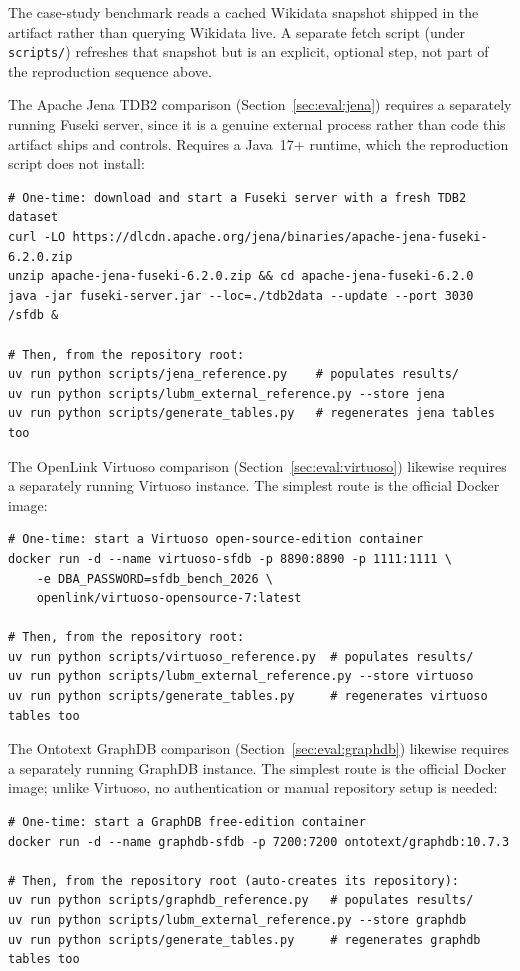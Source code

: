 The case-study benchmark reads a cached Wikidata snapshot shipped in the
artifact rather than querying Wikidata live. A separate fetch script
(under \texttt{scripts/}) refreshes that snapshot but is an explicit,
optional step, not part of the reproduction sequence above.

The Apache Jena TDB2 comparison (Section~\ref{sec:eval:jena}) requires a
separately running Fuseki server, since it is a genuine external process
rather than code this artifact ships and controls. Requires a Java~17+
runtime, which the reproduction script does not install:

\begin{verbatim}
# One-time: download and start a Fuseki server with a fresh TDB2 dataset
curl -LO https://dlcdn.apache.org/jena/binaries/apache-jena-fuseki-6.2.0.zip
unzip apache-jena-fuseki-6.2.0.zip && cd apache-jena-fuseki-6.2.0
java -jar fuseki-server.jar --loc=./tdb2data --update --port 3030 /sfdb &

# Then, from the repository root:
uv run python scripts/jena_reference.py    # populates results/
uv run python scripts/lubm_external_reference.py --store jena
uv run python scripts/generate_tables.py   # regenerates jena tables too
\end{verbatim}

The OpenLink Virtuoso comparison (Section~\ref{sec:eval:virtuoso})
likewise requires a separately running Virtuoso instance. The simplest
route is the official Docker image:

\begin{verbatim}
# One-time: start a Virtuoso open-source-edition container
docker run -d --name virtuoso-sfdb -p 8890:8890 -p 1111:1111 \
    -e DBA_PASSWORD=sfdb_bench_2026 \
    openlink/virtuoso-opensource-7:latest

# Then, from the repository root:
uv run python scripts/virtuoso_reference.py  # populates results/
uv run python scripts/lubm_external_reference.py --store virtuoso
uv run python scripts/generate_tables.py     # regenerates virtuoso tables too
\end{verbatim}

The Ontotext GraphDB comparison (Section~\ref{sec:eval:graphdb})
likewise requires a separately running GraphDB instance. The simplest
route is the official Docker image; unlike Virtuoso, no authentication
or manual repository setup is needed:

\begin{verbatim}
# One-time: start a GraphDB free-edition container
docker run -d --name graphdb-sfdb -p 7200:7200 ontotext/graphdb:10.7.3

# Then, from the repository root (auto-creates its repository):
uv run python scripts/graphdb_reference.py   # populates results/
uv run python scripts/lubm_external_reference.py --store graphdb
uv run python scripts/generate_tables.py     # regenerates graphdb tables too
\end{verbatim}

